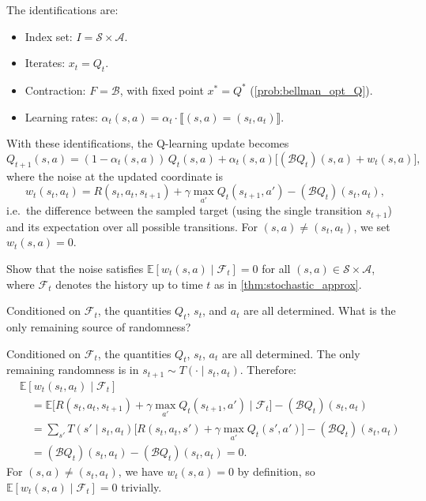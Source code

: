 \documentclass[11pt]{article}
\newcommand{\cS}{\mathcal{S}}
\newcommand{\cA}{\mathcal{A}}
\begin{document}
\begin{solution}
The identifications are:
\begin{itemize}
\item Index set: $I = \cS \times \cA$.
\item Iterates: $x_t = Q_t$.
\item Contraction: $F = \mathcal{B}$, with fixed point $x^* = Q^*$ (\cref{prob:bellman_opt_Q}).
\item Learning rates: $\alpha_t(s,a) = \alpha_t \cdot \llbracket (s,a) = (s_t, a_t) \rrbracket$.
\end{itemize}
With these identifications, the Q-learning update becomes
$$
Q_{t+1}(s,a) = (1 - \alpha_t(s,a))\, Q_t(s,a) + \alpha_t(s,a)\bigl[(\mathcal{B}Q_t)(s,a) + w_t(s,a)\bigr],
$$
where the noise at the updated coordinate is
$$
w_t(s_t, a_t) = R(s_t, a_t, s_{t+1}) + \gamma \max_{a'} Q_t(s_{t+1}, a') - (\mathcal{B}Q_t)(s_t, a_t),
$$
i.e.\ the difference between the sampled target (using the single transition $s_{t+1}$) and its expectation over all possible transitions. For $(s,a) \neq (s_t, a_t)$, we set $w_t(s,a) = 0$.
\end{solution}

\begin{exercise}
\label{prob:noise_zero_mean} Show that the noise satisfies $\mathbb{E}[w_t(s,a) \mid \mathcal{F}_t] = 0$ for all $(s,a) \in \cS \times \cA$, where $\mathcal{F}_t$ denotes the history up to time $t$ as in \cref{thm:stochastic_approx}.

\begin{hint}
Conditioned on $\mathcal{F}_t$, the quantities $Q_t$, $s_t$, and $a_t$ are all determined. What is the only remaining source of randomness?
\end{hint}
\end{exercise}

\begin{solution}
Conditioned on $\mathcal{F}_t$, the quantities $Q_t$, $s_t$, $a_t$ are all determined. The only remaining randomness is in $s_{t+1} \sim T(\cdot \mid s_t, a_t)$. Therefore:
\begin{align*}
&\mathbb{E}[w_t(s_t, a_t) \mid \mathcal{F}_t] \\
&\quad= \mathbb{E}\bigl[R(s_t, a_t, s_{t+1}) + \gamma \max_{a'} Q_t(s_{t+1}, a') \mid \mathcal{F}_t\bigr] - (\mathcal{B}Q_t)(s_t, a_t) \\
&\quad= \sum_{s'} T(s' \mid s_t, a_t)\bigl[R(s_t, a_t, s') + \gamma \max_{a'} Q_t(s', a')\bigr] - (\mathcal{B}Q_t)(s_t, a_t) \\
&\quad= (\mathcal{B}Q_t)(s_t, a_t) - (\mathcal{B}Q_t)(s_t, a_t) = 0.
\end{align*}
For $(s,a) \neq (s_t, a_t)$, we have $w_t(s,a) = 0$ by definition, so $\mathbb{E}[w_t(s,a) \mid \mathcal{F}_t] = 0$ trivially.
\end{solution}
\end{document}
